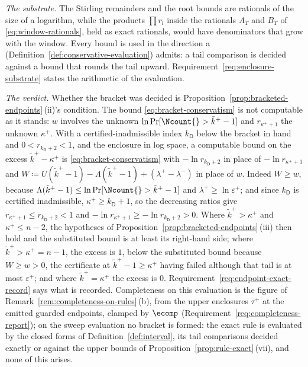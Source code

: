 \begin{remark}
\emph{The substrate.} The Stirling remainders and the root bounds are
rationals of the size of a logarithm, while the products $\prod r_l$ inside
the rationals $A_T$ and $B_T$ of \eqref{eq:window-rationals}, held as exact
rationals, would have denominators that grow with the window. Every bound is
used in the direction a 
(Definition~\ref{def:conservative-evaluation}) admits: a tail comparison is
decided against a bound that rounds the tail upward.
Requirement~\ref{req:enclosure-substrate} states the arithmetic of the
evaluation.

\emph{The verdict.} Whether the bracket was decided is
Proposition~\ref{prop:bracketed-endpoints}\,(ii)'s condition. The bound
\eqref{eq:bracket-conservatism} is not computable as it stands: $w$ involves
the unknown $\ln\Pr[\Ncount{}>\tilde k^{+}-1]$ and $r_{\kappa^{+}+1}$ the
unknown $\kappa^{+}$. With a certified-inadmissible index $k_{\mathsf{D}}$
below the bracket in hand and $0<r_{k_{\mathsf{D}}+2}<1$, and the enclosure
in log space, a computable bound on the excess $\tilde k^{+}-\kappa^{+}$ is
\eqref{eq:bracket-conservatism} with $-\ln r_{k_{\mathsf{D}}+2}$ in place of
$-\ln r_{\kappa^{+}+1}$ and
$W\coloneqq U(\tilde k^{+}-1)-\Lambda(\tilde k^{+}-1)+(\lambda^{+}-\lambda^{-})$
in place of $w$. Indeed $W\ge w$, because
$\Lambda(\tilde k^{+}-1)\le\ln\Pr[\Ncount{}>\tilde k^{+}-1]$ and
$\lambda^{+}\ge\ln\varepsilon^{+}$; and since $k_{\mathsf{D}}$ is certified
inadmissible, $\kappa^{+}\ge k_{\mathsf{D}}+1$, so the decreasing ratios give
$r_{\kappa^{+}+1}\le r_{k_{\mathsf{D}}+2}<1$ and
$-\ln r_{\kappa^{+}+1}\ge-\ln r_{k_{\mathsf{D}}+2}>0$. Where
$\tilde k^{+}>\kappa^{+}$ and $\kappa^{+}\le n-2$, the hypotheses of
Proposition~\ref{prop:bracketed-endpoints}\,(iii) then hold and the
substituted bound is at least its right-hand side; where
$\tilde k^{+}>\kappa^{+}=n-1$, the excess is $1$, below the substituted bound
because $W\ge w>0$, the certificate at $\tilde k^{+}-1\ge\kappa^{+}$ having
failed although that tail is at most $\varepsilon^{+}$; and where
$\tilde k^{+}=\kappa^{+}$ the excess is $0$.
Requirement~\ref{req:endpoint-exact-record} says what is recorded.
Completeness on this evaluation is the figure of
Remark~\ref{rem:completeness-on-rules}\,(b), from the upper enclosures
$\tau^{+}$ at the emitted guarded endpoints, clamped by $\ecomp$
(Requirement~\ref{req:completeness-report}); on the sweep evaluation no
bracket is formed: the exact rule is evaluated by the closed forms of
Definition~\ref{def:interval}, its tail comparisons decided exactly or
against the upper bounds of Proposition~\ref{prop:rule-exact}\,(vii), and
none of this arises.
\end{remark}
